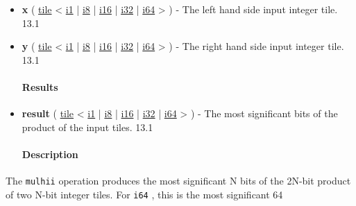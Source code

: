\documentclass{article}
\begin{document}
\begin{itemize}
\item \textbf{x} ( \href{https://docs.nvidia.com/cuda/tile-ir/latest/sections/types.html#type-tile}{tile} < \href{https://docs.nvidia.com/cuda/tile-ir/latest/sections/types.html#subsection-element-types}{i1} | \href{https://docs.nvidia.com/cuda/tile-ir/latest/sections/types.html#subsection-element-types}{i8} | \href{https://docs.nvidia.com/cuda/tile-ir/latest/sections/types.html#subsection-element-types}{i16} | \href{https://docs.nvidia.com/cuda/tile-ir/latest/sections/types.html#subsection-element-types}{i32} | \href{https://docs.nvidia.com/cuda/tile-ir/latest/sections/types.html#subsection-element-types}{i64} > ) - The left hand side input integer tile. 13.1
\item \textbf{y} ( \href{https://docs.nvidia.com/cuda/tile-ir/latest/sections/types.html#type-tile}{tile} < \href{https://docs.nvidia.com/cuda/tile-ir/latest/sections/types.html#subsection-element-types}{i1} | \href{https://docs.nvidia.com/cuda/tile-ir/latest/sections/types.html#subsection-element-types}{i8} | \href{https://docs.nvidia.com/cuda/tile-ir/latest/sections/types.html#subsection-element-types}{i16} | \href{https://docs.nvidia.com/cuda/tile-ir/latest/sections/types.html#subsection-element-types}{i32} | \href{https://docs.nvidia.com/cuda/tile-ir/latest/sections/types.html#subsection-element-types}{i64} > ) - The right hand side input integer tile. 13.1


\paragraph{Results}

\item \textbf{result} ( \href{https://docs.nvidia.com/cuda/tile-ir/latest/sections/types.html#type-tile}{tile} < \href{https://docs.nvidia.com/cuda/tile-ir/latest/sections/types.html#subsection-element-types}{i1} | \href{https://docs.nvidia.com/cuda/tile-ir/latest/sections/types.html#subsection-element-types}{i8} | \href{https://docs.nvidia.com/cuda/tile-ir/latest/sections/types.html#subsection-element-types}{i16} | \href{https://docs.nvidia.com/cuda/tile-ir/latest/sections/types.html#subsection-element-types}{i32} | \href{https://docs.nvidia.com/cuda/tile-ir/latest/sections/types.html#subsection-element-types}{i64} > ) - The most significant bits of the product of the input tiles. 13.1


\paragraph{Description}

\end{itemize}
The \texttt{mulhii} operation produces the most significant N bits of the 2N-bit product of two N-bit integer tiles. For \texttt{i64} , this is the most significant 64
\end{document}
